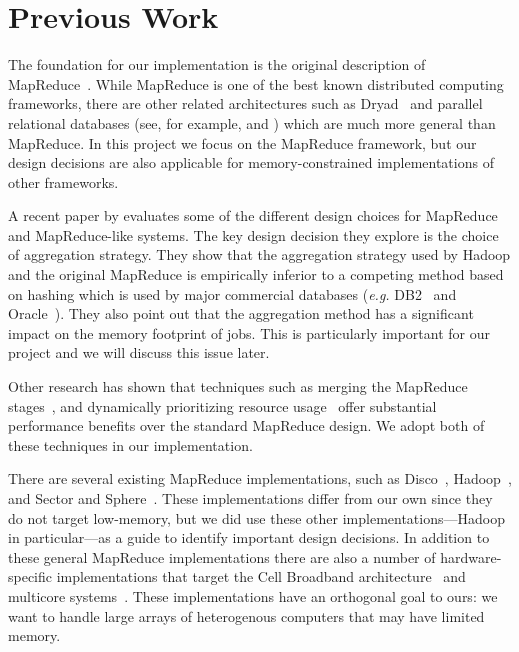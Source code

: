 \documentclass[10pt,letter,final,article,twocolumn]{article} %
\begin{document}
\section{Previous Work}

The foundation for our implementation is the original description of MapReduce~\citep{mapreduce08}. While MapReduce is one of the best known distributed computing frameworks, there are other related architectures such as Dryad~\citep{dryad07} and parallel relational databases (see, for example, \citet{db210} and \citet{teradata10}) which are much more general than MapReduce.  In this project we focus on the MapReduce framework, but our design decisions are also applicable for memory-constrained implementations of other frameworks.

A recent paper by \citet{yu2009distributed} evaluates some of the different design choices for MapReduce and MapReduce-like systems. The key design decision they explore is the choice of aggregation strategy.  They show that the aggregation strategy used by Hadoop and the original MapReduce is empirically inferior to a competing method based on hashing which is used by major commercial databases (\emph{e.g.} DB2~\citep{db210} and Oracle~\citep{oracle10}). They also point out that the aggregation method has a significant impact on the memory footprint of jobs. This is particularly important for our project and we will discuss this issue later.

Other research has shown that techniques such as merging the MapReduce stages~\citep{barrier10}, and dynamically prioritizing resource usage~\citep{sandholm09} offer substantial performance benefits over the standard MapReduce design. We adopt both of these techniques in our implementation.

There are several existing MapReduce implementations, such as Disco~\citep{disco10}, Hadoop~\citep{hadoop10}, and Sector and Sphere~\citep{sphere09}. These implementations differ from our own since they do not target low-memory, but we did use these other implementations---Hadoop in particular---as a guide to identify important design decisions. In addition to these general MapReduce implementations there are also a number of hardware-specific implementations that target the Cell Broadband architecture~\citep{rafique09} and multicore systems~\citep{chu06}. These implementations have an orthogonal goal to ours: we want to handle large arrays of heterogenous computers that may have limited memory.
\end{document}
